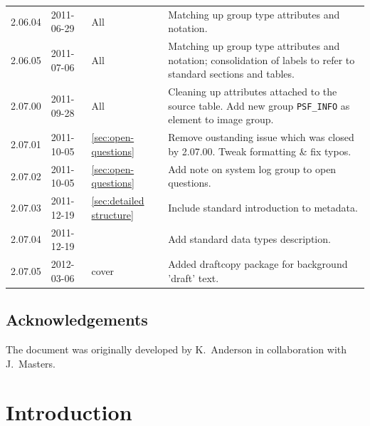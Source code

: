 \documentclass[a4paper,10pt,bibtotoc]{scrartcl}
\begin{document}
\begin{center}
\begin{supertabular}{lllp{9.5cm}}
    2.06.04 & 2011-06-29 & All & Matching up group type attributes and notation. \\

    2.06.05 & 2011-07-06 & All & Matching up group type attributes and
    notation; consolidation of labels to refer to standard sections
    and tables. \\

    2.07.00 & 2011-09-28 & All & Cleaning up attributes attached to the
    source table. Add new group \verb|PSF_INFO| as element to image group. \\

    2.07.01 & 2011-10-05 & \ref{sec:open-questions} & Remove oustanding issue
    which was closed by 2.07.00. Tweak formatting \& fix typos. \\

    2.07.02 & 2011-10-05 & \ref{sec:open-questions} & Add note on system log
    group to open questions. \\

    2.07.03 & 2011-12-19 & \ref{sec:detailed structure} & Include standard
    introduction to metadata. \\

    2.07.04 & 2011-12-19 &  & Add standard data types description. \\

    2.07.05 & 2012-03-06 & cover   & Added draftcopy package for background 'draft' text.\\

\end{supertabular}
\end{center}







\subsection*{Acknowledgements}

The document was originally developed by K.~Anderson in collaboration
with J.~Masters.

\clearpage


\section{Introduction}
\label{sec:introduction}
\end{document}

